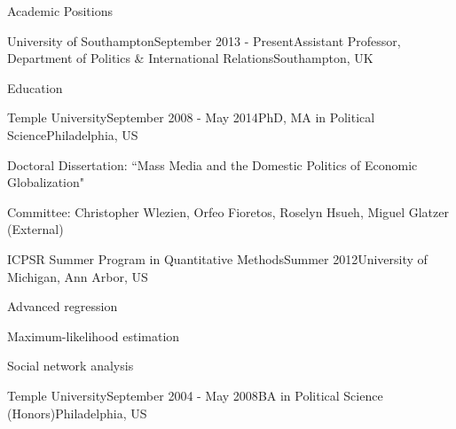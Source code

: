 \documentclass{resume} %
\begin{document}

\begin{rSection}{Academic Positions}

\begin{rSubsection}{University of Southampton}{September 2013 - Present}{Assistant Professor, Department of Politics \& International Relations}{Southampton, UK}
\item
\end{rSubsection}
\end{rSection}



\begin{rSection}{Education}

\begin{rSubsection}{Temple University}{September 2008 - May 2014}{PhD, MA in Political Science}{Philadelphia, US}
\item Doctoral Dissertation: ``Mass Media and the Domestic Politics of Economic Globalization"
\item Committee: Christopher Wlezien, Orfeo Fioretos, Roselyn Hsueh, Miguel Glatzer (External)
\end{rSubsection}

\begin{rSubsection}{ICPSR Summer Program in Quantitative Methods}{Summer 2012}{}{University of Michigan, Ann Arbor, US}
\item Advanced regression
\item Maximum-likelihood estimation
\item Social network analysis
\end{rSubsection}

\begin{rSubsection}{Temple University}{September 2004 - May 2008}{BA in Political Science (Honors)}{Philadelphia, US}
\item 
\end{rSubsection}

\end{rSection}

\end{document}
